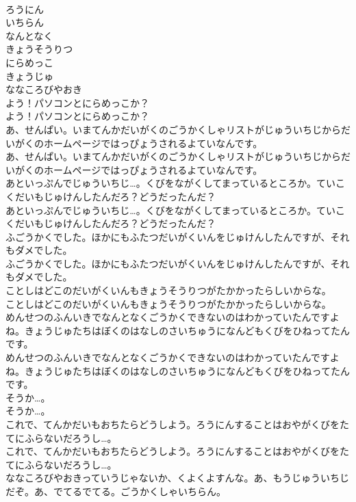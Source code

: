 \documentclass[8pt]{extreport}
\begin{document}
\begin{CJK}{UTF8}{min}
\\	ろうにん
\\	いちらん
\\	なんとなく
\\	きょうそうりつ
\\	にらめっこ
\\	きょうじゅ
\\	ななころびやおき
\\	よう！パソコンとにらめっこか？	
\\	よう！パソコンとにらめっこか？ 
\\	あ、せんぱい。いまてんかだいがくのごうかくしゃリストがじゅういちじからだいがくのホームページではっぴょうされるよていなんです。	
\\	あ、せんぱい。いまてんかだいがくのごうかくしゃリストがじゅういちじからだいがくのホームページではっぴょうされるよていなんです。 
\\	あといっぷんでじゅういちじ…。くびをながくしてまっているところか。ていこくだいもじゅけんしたんだろ？どうだったんだ？	
\\	あといっぷんでじゅういちじ…。くびをながくしてまっているところか。ていこくだいもじゅけんしたんだろ？どうだったんだ？ 
\\	ふごうかくでした。ほかにもふたつだいがくいんをじゅけんしたんですが、それもダメでした。	
\\	ふごうかくでした。ほかにもふたつだいがくいんをじゅけんしたんですが、それもダメでした。 
\\	ことしはどこのだいがくいんもきょうそうりつがたかかったらしいからな。	
\\	ことしはどこのだいがくいんもきょうそうりつがたかかったらしいからな。 
\\	めんせつのふんいきでなんとなくごうかくできないのはわかっていたんですよね。きょうじゅたちはぼくのはなしのさいちゅうになんどもくびをひねってたんです。	
\\	めんせつのふんいきでなんとなくごうかくできないのはわかっていたんですよね。きょうじゅたちはぼくのはなしのさいちゅうになんどもくびをひねってたんです。 
\\	そうか…。	
\\	そうか…。 
\\	これで、てんかだいもおちたらどうしよう。ろうにんすることはおやがくびをたてにふらないだろうし…。	
\\	これで、てんかだいもおちたらどうしよう。ろうにんすることはおやがくびをたてにふらないだろうし…。 
\\	ななころびやおきっていうじゃないか、くよくよすんな。あ、もうじゅういちじだぞ。あ、でてるでてる。ごうかくしゃいちらん。	

\end{CJK}
\end{document}
